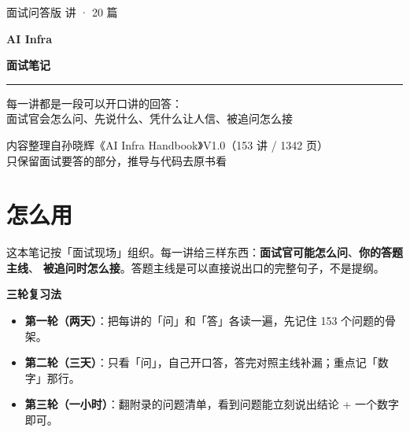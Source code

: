 \documentclass[UTF8,10.5pt,openany]{ctexbook}
\newcommand{\kai}{\CJKfamily{zhkai}}
\begin{document}
\thispagestyle{empty}
\begin{center}
\vspace*{3.2cm}
{\sffamily\fontsize{10}{14}\selectfont\color{grayt}面试问答版  讲 · 20 篇}\par
\vspace{14pt}
{\sffamily\bfseries\fontsize{30}{40}\selectfont AI Infra}\par
\vspace{6pt}
{\sffamily\bfseries\fontsize{22}{30}\selectfont 面试笔记}\par
\vspace{18pt}
{\color{linet}\rule{0.5\textwidth}{0.6pt}}\par
\vspace{16pt}
{\kai\fontsize{12}{19}\selectfont
每一讲都是一段可以开口讲的回答：\\[3pt]
面试官会怎么问、先说什么、凭什么让人信、被追问怎么接\par}
\vfill
{\sffamily\footnotesize\color{grayt}
内容整理自孙晓辉《AI Infra Handbook》V1.0（153 讲 / 1342 页）\\[2pt]
只保留面试要答的部分，推导与代码去原书看\par}
\vspace{1.2cm}
\end{center}
\clearpage


\chapter*{怎么用}

这本笔记按「面试现场」组织。每一讲给三样东西：\textbf{面试官可能怎么问}、\textbf{你的答题主线}、
\textbf{被追问时怎么接}。答题主线是可以直接说出口的完整句子，不是提纲。

\vspace{4pt}
{\sffamily\bfseries 三轮复习法}\par\vspace{2pt}
\begin{itemize}[leftmargin=1.6em,itemsep=2pt,topsep=2pt]
\item \textbf{第一轮（两天）}：把每讲的「问」和「答」各读一遍，先记住 153 个问题的骨架。
\item \textbf{第二轮（三天）}：只看「问」，自己开口答，答完对照主线补漏；重点记「数字」那行。
\item \textbf{第三轮（一小时）}：翻附录的问题清单，看到问题能立刻说出结论 + 一个数字即可。
\end{itemize}
\end{document}
